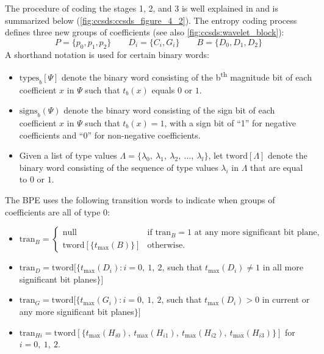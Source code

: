 The procedure of coding the stages 1, 2, and 3 is well explained in \cite[pp.~4-27~ff]{CCSDS122blue} and is summarized below (\autoref{fig:ccsds:ccsds_figure_4_2}). The entropy coding process defines three new groups of coefficients (see also \autoref{fig:ccsds:wavelet_block}):
\begin{equation}
P=\{p_0,p_1,p_2\}\qquad D_i=\{C_i,G_i\}\qquad B=\{D_0,D_1,D_2\}
\end{equation}
A shorthand notation is used for certain binary words:
\begin{itemize}
  \item $\mathrm{types}_b[\Psi]$ denote the binary word consisting of the b\textsuperscript{th} magnitude bit of each coefficient $x$ in $\Psi$ such that $t_b(x)$ equals $0$ or $1$.
  \item $\mathrm{signs}_b(\Psi)$ denote the binary word consisting of the sign bit of each coefficient $x$ in $\Psi$ such that $t_b(x)=1$, with a sign bit of ``1'' for negative coefficients and ``0'' for non-negative coefficients.
  \item Given a list of type values $\Lambda=\{\lambda_0,\ \lambda_1,\ \lambda_2,\ \ldots,\ \lambda_l\}$, let $\mathrm{tword}[\Lambda]$ denote the binary word consisting of the sequence of type values $\lambda_i$ in $\Lambda$ that are equal to $0$ or $1$.
\end{itemize}
The \gls{BPE} uses the following transition words to indicate when groups of coefficients are all of type $0$:
\begin{itemize}
  \item $\mathrm{tran}_B=
        \begin{cases}
          \text{null}                           & \text{if $\mathrm{tran}_B=1$ at any more significant bit plane,}\\
          \mathrm{tword}[\{t_\mathrm{max}(B)\}] & \text{otherwise}.
        \end{cases}$
  \item $\mathrm{tran}_D=\mathrm{tword}[\{t_\mathrm{max}(D_i):i=0,\ 1,\ 2$, such that $t_\mathrm{max}(D_i)\neq 1$ in all more significant bit planes$\}]$
  \item $\mathrm{tran}_G=\mathrm{tword}[\{t_\mathrm{max}(G_i):i=0,\ 1,\ 2$, such that $t_\mathrm{max}(D_i)>0$ in current or any more significant bit planes$\}]$
  \item $\mathrm{tran}_{Hi}=\mathrm{tword}[\{t_\mathrm{max}(H_{i0}),\ t_\mathrm{max}(H_{i1}),\ t_\mathrm{max}(H_{i2}),\ t_\mathrm{max}(H_{i3})\}]$ for $i=0,\ 1,\ 2$.
\end{itemize}

